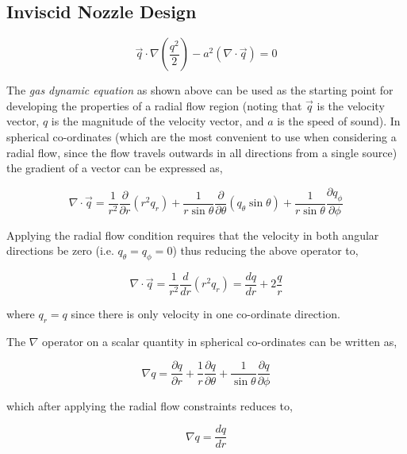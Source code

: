 \subsection{Inviscid Nozzle Design}

\begin{equation}
	\vec{q}\cdot\nabla(\frac{q^2}{2}) - a^2(\nabla \cdot \vec{q}) = 0 	
\label{eqn:gasdynq}
\end{equation}

	The \emph{gas dynamic equation} as shown above can be used as the starting point for developing 
the properties of a radial flow region (noting that $\vec{q}$ is the velocity vector, $q$ is the
magnitude of the velocity vector, and $a$ is the speed of sound).  In spherical co-ordinates
(which are the most convenient to use when considering a radial flow, since the flow travels outwards 
in all directions from a single source) the gradient of a vector can be expressed as,

\begin{equation}
	\nabla\cdot\vec{q} = \frac{1}{r^2}\frac{\partial}{\partial r}(r^2q_r) +
	\frac{1}{r \sin\theta}\frac{\partial}{\partial \theta}(q_{\theta}\sin\theta ) + 
	\frac{1}{r \sin\theta}\frac{\partial q_{\phi}}{\partial \phi}
\label{eqn:delq}
\end{equation}

	Applying the radial flow condition requires that the velocity in both angular 
directions be zero (i.e. $q_{\theta} = q_{\phi} = 0$) thus reducing the above operator to,

\begin{equation}
	\nabla\cdot\vec{q} = \frac{1}{r^2}\frac{d}{dr}(r^2q_r) = 
	\frac{dq}{dr} + 2\frac{q}{r}
\label{eqn:raddelq}
\end{equation}

	where $q_r = q$ since there is only velocity in one co-ordinate direction.

	The $\nabla$ operator on a scalar quantity in spherical co-ordinates can
be written as,

\begin{equation}
	\nabla q = \frac{\partial q}{\partial r} + \frac{1}{r}\frac{\partial q}{\partial \theta}
	+ \frac{1}{\sin \theta}\frac{\partial q}{\partial \phi}
\label{eqn:delscalq}
\end{equation}

	which after applying the radial flow constraints reduces to,

\begin{equation}
	\nabla q = \frac{dq}{dr} 
\label{eqn:raddelscalq}
\end{equation}

